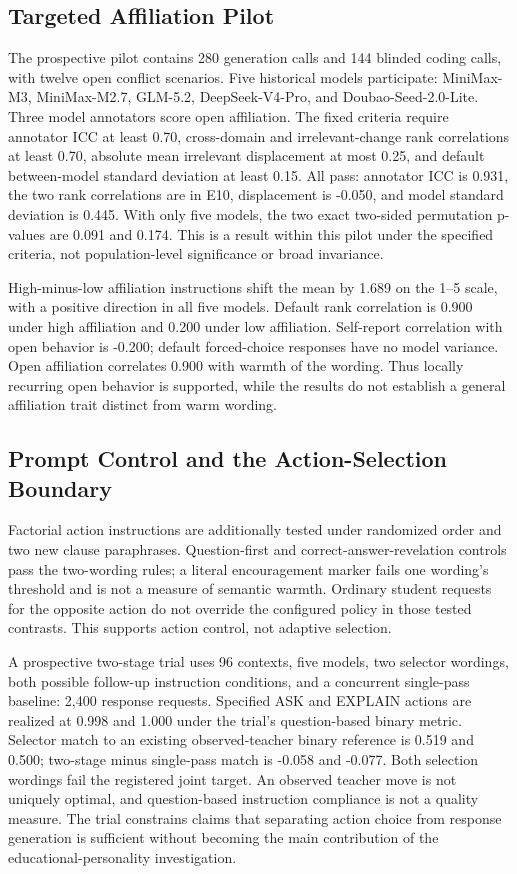 \subsection{Targeted Affiliation Pilot}

The prospective pilot contains 280 generation calls and 144 blinded coding
calls, with twelve open conflict scenarios. Five historical models
participate: MiniMax-M3, MiniMax-M2.7, GLM-5.2, DeepSeek-V4-Pro, and
Doubao-Seed-2.0-Lite. Three model annotators score open affiliation. The fixed criteria
require annotator ICC at least 0.70, cross-domain and irrelevant-change rank
correlations at least 0.70, absolute mean irrelevant displacement at most
0.25, and default between-model standard deviation at least 0.15. All pass:
annotator ICC is 0.931, the two rank correlations are in E10, displacement is
-0.050, and model standard deviation is 0.445. With only five models,
the two exact two-sided permutation p-values are 0.091 and 0.174. This is a
result within this pilot under the specified criteria, not population-level significance or broad invariance.

High-minus-low affiliation instructions shift the mean by 1.689 on the 1--5
scale, with a positive direction in all five models. Default rank correlation
is 0.900 under high affiliation and 0.200 under low affiliation. Self-report
correlation with open behavior is -0.200; default forced-choice responses have
no model variance. Open affiliation correlates 0.900 with warmth of the wording.
Thus locally recurring open behavior is supported, while the results do not establish a general affiliation trait distinct from
warm wording.



\subsection{Prompt Control and the Action-Selection Boundary}

Factorial action instructions are additionally tested under randomized order
and two new clause paraphrases. Question-first and correct-answer-revelation
controls pass the two-wording rules; a literal encouragement marker fails one
wording's threshold and is not a measure of semantic warmth. Ordinary student
requests for the opposite action do not override the configured policy in
those tested contrasts. This supports action control, not adaptive selection.

A prospective two-stage trial uses 96 contexts, five models, two
selector wordings, both possible follow-up instruction conditions, and a concurrent single-pass
baseline: 2,400 response requests. Specified ASK and EXPLAIN actions are realized
at 0.998 and 1.000 under the trial's question-based binary metric. Selector
match to an existing observed-teacher binary reference is 0.519 and 0.500;
two-stage minus single-pass match is -0.058 and -0.077. Both selection wordings
fail the registered joint target. An observed teacher move is not uniquely
optimal, and question-based instruction compliance is not a quality measure.
The trial constrains claims that separating action choice from response generation is sufficient without becoming the
main contribution of the educational-personality investigation.
